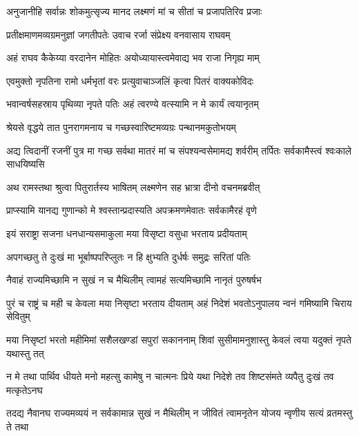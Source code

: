 \twolineshloka
{अनुजानीहि सर्वान्नः शोकमुत्सृज्य मानद}
{लक्ष्मणं मां च सीतां च प्रजापतिरिव प्रजाः} %

\twolineshloka
{प्रतीक्षमाणमव्यग्रमनुज्ञां जगतीपतेः}
{उवाच रर्जा संप्रेक्ष्य वनवासाय राघवम्} %

\twolineshloka
{अहं राघव कैकेय्या वरदानेन मोहितः}
{अयोध्यायास्त्वमेवाद्य भव राजा निगृह्य माम्} %

\twolineshloka
{एवमुक्तो नृपतिना रामो धर्मभृतां वरः}
{प्रत्युवाचाञ्जलिं कृत्वा पितरं वाक्यकोविदः} %

\twolineshloka
{भवान्वर्षसहस्राय पृथिव्या नृपते पतिः}
{अहं त्वरण्ये वत्स्यामि न मे कार्यं त्वयानृतम्} %

\twolineshloka
{श्रेयसे वृद्धये तात पुनरागमनाय च}
{गच्छस्वारिष्टमव्यग्रः पन्थानमकुतोभयम्} %

\threelineshloka
{अद्य त्विदानीं रजनीं पुत्र मा गच्छ सर्वथा}
{मातरं मां च संपश्यन्वसेमामद्य शर्वरीम्}
{तर्पितः सर्वकामैस्त्वं श्वःकाले साधयिष्यसि} %

\twolineshloka
{अथ रामस्तथा श्रुत्वा पितुरार्तस्य भाषितम्}
{लक्ष्मणेन सह भ्रात्रा दीनो वचनमब्रवीत्} %

\twolineshloka
{प्राप्स्यामि यानद्य गुणान्को मे श्वस्तान्प्रदास्यति}
{अपक्रमणमेवातः सर्वकामैरहं वृणे} %

\twolineshloka
{इयं सराष्ट्रा सजना धनधान्यसमाकुला}
{मया विसृष्टा वसुधा भरताय प्रदीयताम्} %

\twolineshloka
{अपगच्छतु ते दुःखं मा भूर्बाष्पपरिप्लुतः}
{न हि क्षुभ्यति दुर्धर्षः समुद्रः सरितां पतिः} %

\twolineshloka
{नैवाहं राज्यमिच्छामि न सुखं न च मैथिलीम्}
{त्वामहं सत्यमिच्छामि नानृतं पुरुषर्षभ} %

\fourlineindentedshloka
{पुरं च राष्ट्रं च मही च केवला}
{ मया निसृष्टा भरताय दीयताम्}
{अहं निदेशं भवतोऽनुपालय}
{न्वनं गमिष्यामि चिराय सेवितुम्} %

\fourlineindentedshloka
{मया निसृष्टां भरतो महीमिमां}
{ सशैलखण्डां सपुरां सकाननाम्}
{शिवां सुसीमामनुशास्तु केवलं}
{ त्वया यदुक्तं नृपते यथास्तु तत्} %

\fourlineindentedshloka
{न मे तथा पार्थिव धीयते मनो}
{ महत्सु कामेषु न चात्मनः प्रिये}
{यथा निदेशे तव शिष्टसंमते}
{ व्यपैतु दुःखं तव मत्कृतेऽनघ} %

\fourlineindentedshloka
{तदद्य नैवानघ राज्यमव्ययं}
{ न सर्वकामान्न सुखं न मैथिलीम्}
{न जीवितं त्वामनृतेन योजय}
{न्वृणीय सत्यं व्रतमस्तु ते तथा} %

